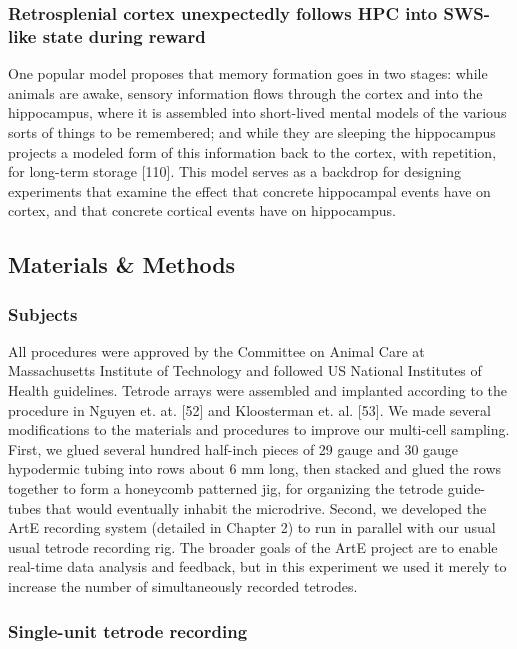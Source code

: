 \documentclass[]{article}
\begin{document}
\subsubsection{Retrosplenial cortex unexpectedly follows HPC into
SWS-like state during reward}

One popular model proposes that memory formation goes in two stages:
while animals are awake, sensory information flows through the cortex
and into the hippocampus, where it is assembled into short-lived mental
models of the various sorts of things to be remembered; and while they
are sleeping the hippocampus projects a modeled form of this information
back to the cortex, with repetition, for long-term storage {[}110{]}.
This model serves as a backdrop for designing experiments that examine
the effect that concrete hippocampal events have on cortex, and that
concrete cortical events have on hippocampus.

\subsection{Materials \& Methods}

\subsubsection{Subjects}

All procedures were approved by the Committee on Animal Care at
Massachusetts Institute of Technology and followed US National
Institutes of Health guidelines. Tetrode arrays were assembled and
implanted according to the procedure in Nguyen et. at. {[}52{]} and
Kloosterman et. al. {[}53{]}. We made several modifications to the
materials and procedures to improve our multi-cell sampling. First, we
glued several hundred half-inch pieces of 29 gauge and 30 gauge
hypodermic tubing into rows about 6 mm long, then stacked and glued the
rows together to form a honeycomb patterned jig, for organizing the
tetrode guide-tubes that would eventually inhabit the microdrive.
Second, we developed the ArtE recording system (detailed in Chapter 2)
to run in parallel with our usual usual tetrode recording rig. The
broader goals of the ArtE project are to enable real-time data analysis
and feedback, but in this experiment we used it merely to increase the
number of simultaneously recorded tetrodes.

\subsubsection{Single-unit tetrode recording}
\end{document}
